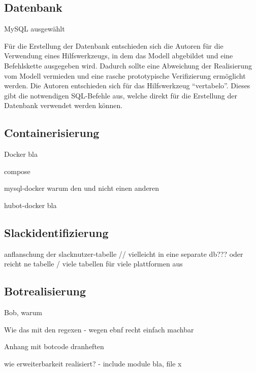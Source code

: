\subsection{Datenbank}

MySQL ausgewählt

Für die Erstellung der Datenbank entschieden sich die Autoren für die Verwendung eines Hilfswerkzeugs, in dem das Modell abgebildet und eine Befehlskette ausgegeben wird. Dadurch sollte eine Abweichung der Realisierung vom Modell vermieden und eine rasche prototypische Verifizierung ermöglicht werden. Die Autoren entschieden sich für das Hilfswerkzeug \enquote{vertabelo}. Dieses gibt die notwendigen SQL-Befehle aus, welche direkt für die Erstellung der Datenbank verwendet werden können.





\subsection{Containerisierung}

Docker bla

compose

mysql-docker warum den und nicht einen anderen

hubot-docker bla



\subsection{Slackidentifizierung}

anflanschung der slacknutzer-tabelle // vielleicht in eine separate db??? oder reicht ne tabelle / viele tabellen für viele plattformen aus

\subsection{Botrealisierung}

Bob, warum

Wie das mit den regexen - wegen ebnf recht einfach machbar

Anhang mit botcode dranheften

wie erweiterbarkeit realisiert? - include module bla, file x